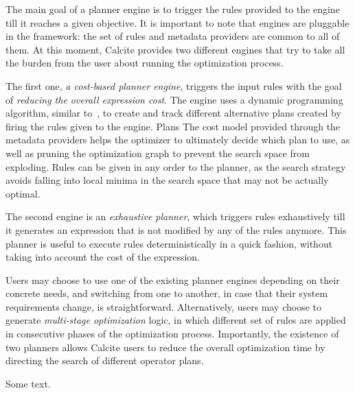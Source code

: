  The main goal of a planner engine is to trigger the rules provided to the engine till it reaches a given objective. It is important to note that engines are pluggable in the framework: the set of rules and metadata providers are common to all of them. At this moment, Calcite provides two different engines that try to take all the burden from the user about running the optimization process.

The first one, \textit{a cost-based planner engine}, triggers the input rules with the goal of \textit{reducing the overall expression cost}. The engine uses a dynamic programming algorithm, similar to~\cite{Graefe93thevolcano,DBLP:journals/debu/Graefe95a}, to create and track different alternative plans created by firing the rules given to the engine. Plans  The cost model provided through the metadata providers helps the optimizer to ultimately decide which plan to use, as well as pruning the optimization graph to prevent the search space from exploding. Rules can be given in any order to the planner, as the search strategy avoids falling into local minima in the search space that may not be actually optimal.

The second engine is an \textit{exhaustive planner}, which triggers rules exhaustively till it generates an expression that is not modified by any of the rules anymore. This planner is useful to execute rules deterministically in a quick fashion, without taking into account the cost of the expression.

Users may choose to use one of the existing planner engines depending on their concrete needs, and switching from one to another, in case that their system requirements change, is straightforward. Alternatively, users may choose to generate \textit{multi-stage optimization} logic, in which different set of rules are applied in consecutive phases of the optimization process. Importantly, the existence of two planners allows Calcite users to reduce the overall optimization time by directing the search of different operator plans.



Some text.
